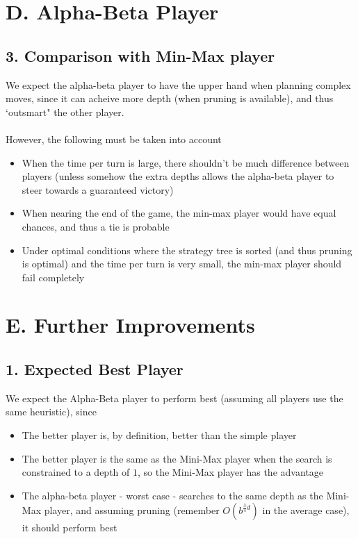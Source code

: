 \documentclass{article}
\begin{document}
\section*{D. Alpha-Beta Player}
\subsection*{3. Comparison with Min-Max player}
We expect the alpha-beta player to have the upper hand when planning complex moves, since it can acheive more depth (when pruning is available), and thus `outsmart" the other player. \\~\\
However, the following must be taken into account
\begin{itemize}
\item When the time per turn is large, there shouldn't be much difference between players (unless somehow the extra depths allows the alpha-beta player to steer towards a guaranteed victory)
\item When nearing the end of the game, the min-max player would have equal chances, and thus a tie is probable
\item Under optimal conditions where the strategy tree is sorted (and thus pruning is optimal) and the time per turn is very small, the min-max player should fail completely
\end{itemize}

\section*{E. Further Improvements}
\subsection*{1. Expected Best Player}
We expect the Alpha-Beta player to perform best (assuming all players use the same heuristic), since
\begin{itemize}
\item The better player is, by definition, better than the simple player
\item The better player is the same as the Mini-Max player when the search is constrained to a depth of $1$, so the Mini-Max player has the advantage
\item The alpha-beta player - worst case - searches to the same depth as the Mini-Max player, and assuming pruning (remember $O(b^{\frac{3}{4} d})$ in the average case), it should perform best
\end{itemize}
\end{document}
